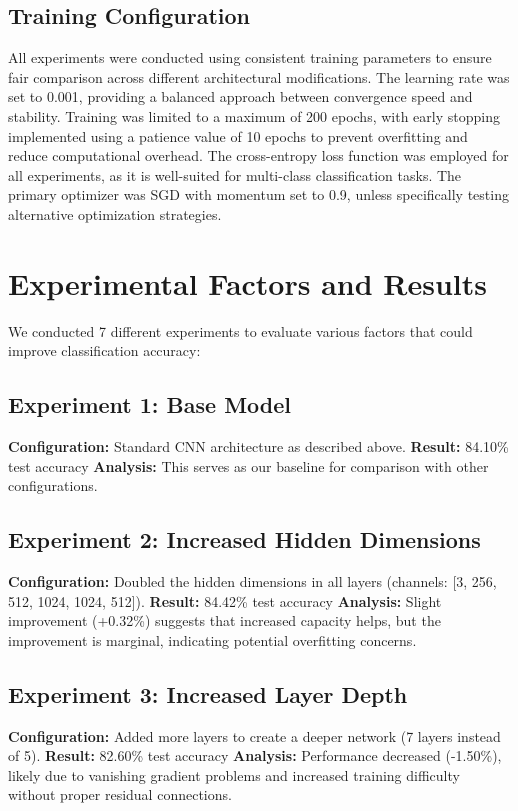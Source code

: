 \documentclass{article}
\begin{document}
\subsection{Training Configuration}

All experiments were conducted using consistent training parameters to ensure fair comparison across different architectural modifications. The learning rate was set to 0.001, providing a balanced approach between convergence speed and stability. Training was limited to a maximum of 200 epochs, with early stopping implemented using a patience value of 10 epochs to prevent overfitting and reduce computational overhead. The cross-entropy loss function was employed for all experiments, as it is well-suited for multi-class classification tasks. The primary optimizer was SGD with momentum set to 0.9, unless specifically testing alternative optimization strategies.

\section{Experimental Factors and Results}

We conducted 7 different experiments to evaluate various factors that could improve classification accuracy:

\subsection{Experiment 1: Base Model}
\textbf{Configuration:} Standard CNN architecture as described above.
\textbf{Result:} 84.10\% test accuracy
\textbf{Analysis:} This serves as our baseline for comparison with other configurations.

\subsection{Experiment 2: Increased Hidden Dimensions}
\textbf{Configuration:} Doubled the hidden dimensions in all layers (channels: [3, 256, 512, 1024, 1024, 512]).
\textbf{Result:} 84.42\% test accuracy
\textbf{Analysis:} Slight improvement (+0.32\%) suggests that increased capacity helps, but the improvement is marginal, indicating potential overfitting concerns.

\subsection{Experiment 3: Increased Layer Depth}
\textbf{Configuration:} Added more layers to create a deeper network (7 layers instead of 5).
\textbf{Result:} 82.60\% test accuracy
\textbf{Analysis:} Performance decreased (-1.50\%), likely due to vanishing gradient problems and increased training difficulty without proper residual connections.
\end{document}
